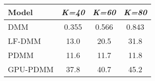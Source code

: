 \begin{tabular}{|l|ccc|}
\hline
\textbf{Model} & \textit{K=40} & \textit{K=60} & \textit{K=80} \\
\hline
           DMM &         0.355 &         0.566 &         0.843 \\
        LF-DMM &          13.0 &          20.5 &          31.8 \\
          PDMM &          11.6 &          11.7 &          11.8 \\
      GPU-PDMM &          37.8 &          40.7 &          45.2 \\
\hline
\end{tabular}
